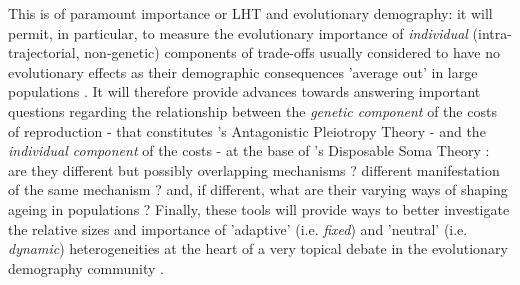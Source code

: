 \documentclass[10pt,a4paper]{article}
\begin{document}
This is of paramount importance or LHT and evolutionary demography:
it will permit, in particular, to measure  the evolutionary importance of \emph{individual} (intra-trajectorial, non-genetic) components of trade-offs usually  considered to have no evolutionary effects as their demographic consequences 'average out' in large populations \citep{Snyder2018}. It will therefore provide advances towards answering important questions regarding the relationship between the \emph{genetic component} of the costs of reproduction  -  that constitutes \citep{Williams1957}'s Antagonistic Pleiotropy Theory - and the \emph{individual component} of the costs - at the base of \citep{Kirkwood1979}'s Disposable Soma Theory : are they different but possibly overlapping mechanisms \citep{Flatt2011a,Kirkwood1991,Partridge1991} ? different manifestation of the same mechanism \citep[see][]{Gavrilov2002,Rodriguez2017} ? and, if different, what are their varying ways of shaping ageing in populations ?
Finally, these tools will provide ways to better investigate the relative sizes and importance of 'adaptive' (i.e. \emph{fixed}) and 'neutral' (i.e. \emph{dynamic}) heterogeneities at the heart of a very topical debate in the evolutionary demography community \citep[see][]{Cam2016}.\\
\end{document}
